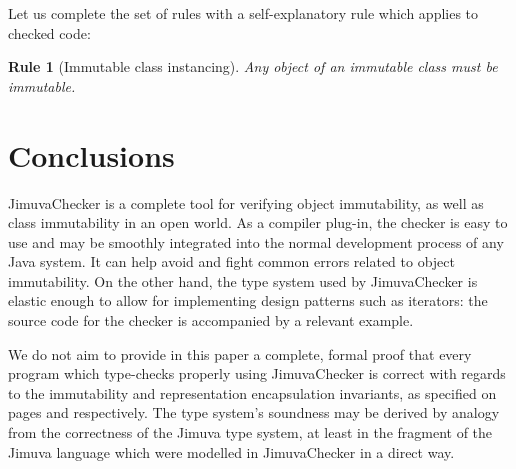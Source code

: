 \documentclass{pracamgr}
\theoremstyle{break}
\theoremstyle{break}
\theoremstyle{break}
\newtheorem{verrule}{Rule}
\begin{document}
Let us complete the set of rules with a self-explanatory rule which
applies to checked code:
\begin{verrule}[Immutable class instancing]
  Any object of an immutable class must be immutable. 
\end{verrule}

\section{Conclusions}

JimuvaChecker is a complete tool for verifying object immutability, as
well as class immutability in an open world. As a compiler plug-in,
the checker is easy to use and may be smoothly integrated into the
normal development process of any Java system. It can help avoid and
fight common errors related to object immutability. On the other hand,
the type system used by JimuvaChecker is elastic enough to allow for
implementing design patterns such as iterators: the source code for
the checker is accompanied by a relevant example. 

We do not aim to provide in this paper a complete, formal proof that
every program which type-checks properly using JimuvaChecker is
correct with regards to the immutability and representation
encapsulation invariants, as specified on pages \pageref{inv:open} and
\pageref{inv:encap} respectively. The type system's soundness may be
derived by analogy from the correctness of the Jimuva type system, at
least in the fragment of the Jimuva language which were modelled in
JimuvaChecker in a direct way.
\end{document}
